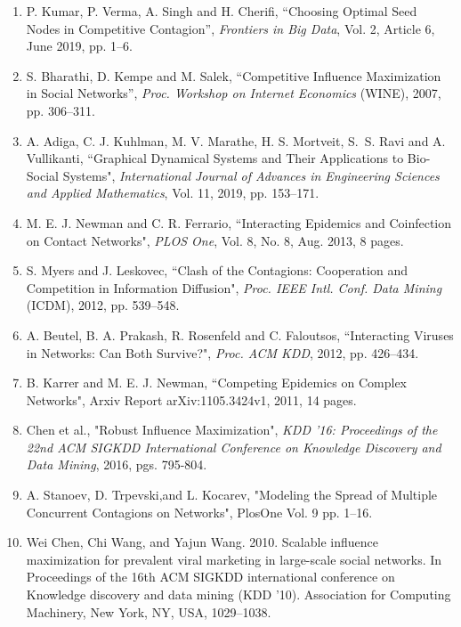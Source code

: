 \documentclass[11pt]{article}
\begin{document}
\begin{enumerate}
\item   P. Kumar, P. Verma, A. Singh and H. Cherifi,
``Choosing Optimal Seed Nodes in Competitive Contagion”, 
\emph{Frontiers in Big Data}, Vol. 2, Article 6, June 2019, pp. 1--6.

\item S. Bharathi, D. Kempe and M. Salek, ``Competitive Influence 
Maximization in Social Networks”, \emph{Proc. Workshop on Internet Economics}
(WINE), 2007, pp. 306--311.

\item A. Adiga, C. J. Kuhlman, M. V. Marathe, H. S. Mortveit, 
S.~S. Ravi and A. Vullikanti, ``Graphical Dynamical Systems and Their
Applications to Bio-Social Systems", \emph{International Journal of Advances
in Engineering Sciences and Applied Mathematics}, Vol. 11, 2019, pp. 153--171.

\item M. E. J. Newman and C. R. Ferrario, ``Interacting Epidemics and 
Coinfection on Contact Networks", \emph{PLOS One}, Vol. 8, No. 8, Aug. 2013,
8 pages.

\item S. Myers and J. Leskovec, ``Clash of the Contagions: Cooperation and 
Competition in Information Diffusion", \emph{Proc. IEEE Intl. Conf. Data Mining}
(ICDM), 2012, pp. 539--548.

\item A. Beutel, B. A. Prakash, R. Rosenfeld and C. Faloutsos,
``Interacting Viruses in Networks: Can Both Survive?", 
\emph{Proc. ACM KDD}, 2012, pp. 426--434.

\item B. Karrer and M. E. J. Newman, ``Competing Epidemics on Complex Networks",
Arxiv Report arXiv:1105.3424v1, 2011, 14 pages.

\item Chen et al., "Robust Influence Maximization", \emph{KDD '16: Proceedings of the 22nd ACM SIGKDD International Conference on Knowledge Discovery and Data Mining}, 2016, pgs. 795-804.

\item A. Stanoev, D. Trpevski,and L. Kocarev, "Modeling the Spread of Multiple Concurrent Contagions on Networks", PlosOne Vol. 9 pp. 1--16.
\item Wei Chen, Chi Wang, and Yajun Wang. 2010. Scalable influence maximization for prevalent viral marketing in large-scale social networks. In Proceedings of the 16th ACM SIGKDD international conference on Knowledge discovery and data mining (KDD ’10). Association for Computing Machinery, New York, NY, USA, 1029–1038. 
  

\end{enumerate}
\end{document}
